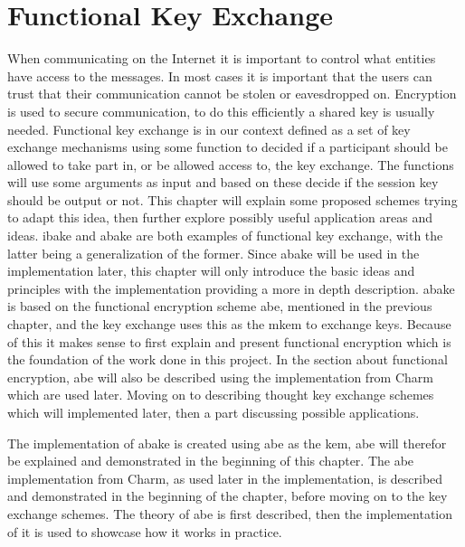 \chapter{Functional Key Exchange}\label{chp:funckeyenc} 
When communicating on the Internet it is important to control what entities have access to the messages. In most cases it is important that the users can trust that their communication cannot be stolen or eavesdropped on. Encryption is used to secure communication, to do this efficiently a shared key is usually needed. Functional key exchange is in our context defined as a set of key exchange mechanisms using some function to decided if a participant should be allowed to take part in, or be allowed access to, the key exchange. The functions will use some arguments as input and based on these decide if the session key should be output or not. This chapter will explain some proposed schemes trying to adapt this idea, then further explore possibly useful application areas and ideas. \Gls{ibake} and \gls{abake} are both examples of functional key exchange, with the latter being a generalization of the former. Since \gls{abake} will be used in the implementation later, this chapter will only introduce the basic ideas and principles with the implementation providing a more in depth description.
\Gls{abake} is based on the functional encryption scheme \gls{abe}, mentioned in the previous chapter, and the key exchange uses this as the m\Gls{kem} to exchange keys. Because of this it makes sense to first explain and present functional encryption which is the foundation of the work done in this project. In the section about functional encryption, \gls{abe} will also be described using the implementation from Charm which are used later. Moving on to describing thought key exchange schemes which will implemented later, then a part discussing possible applications. 

 The implementation of \gls{abake} is created using \gls{abe} as the \gls{kem}, \gls{abe} will therefor be explained and demonstrated in the beginning of this chapter. The \gls{abe} implementation from Charm, as used later in the implementation, is described and demonstrated in the beginning of the chapter, before moving on to the key exchange schemes. The theory of \gls{abe} is first described, then the implementation of it is used to showcase how it works in practice. 


